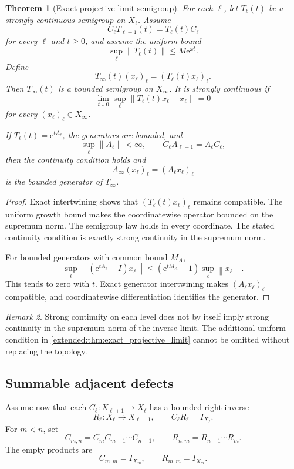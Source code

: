 \documentclass[11pt,a4paper]{article}
\newtheorem{theorem}{Theorem}[section]
\theoremstyle{definition}
\theoremstyle{remark}
\newtheorem{remark}[theorem]{Remark}
\newcommand{\norm}[1]{\left\lVert#1\right\rVert}
\newcommand{\e}{\mathrm e}
\begin{document}
\begin{theorem}[Exact projective limit semigroup]\label{extended:record:016}\label{extended:thm:exact_projective_limit}
For each \(\ell\), let \(T_\ell(t)\) be a strongly continuous semigroup on \(X_\ell\). Assume
\[
C_\ell T_{\ell+1}(t)=T_\ell(t)C_\ell
\]
for every \(\ell\) and \(t\geq0\), and assume the uniform bound
\[
\sup_\ell\norm{T_\ell(t)}\leq M\e^{\omega t}.
\]
Define
\[
T_\infty(t)(x_\ell)_\ell
=
(T_\ell(t)x_\ell)_\ell.
\]
Then \(T_\infty(t)\) is a bounded semigroup on \(X_\infty\). It is strongly continuous if
\[
\lim_{t\downarrow0}
\sup_\ell
\norm{T_\ell(t)x_\ell-x_\ell}=0
\]
for every \((x_\ell)_\ell\in X_\infty\).

If \(T_\ell(t)=\e^{tA_\ell}\), the generators are bounded, and
\[
\sup_\ell\norm{A_\ell}<\infty,
\qquad
C_\ell A_{\ell+1}=A_\ell C_\ell,
\]
then the continuity condition holds and
\[
A_\infty(x_\ell)_\ell=(A_\ell x_\ell)_\ell
\]
is the bounded generator of \(T_\infty\).
\end{theorem}

\begin{proof}
Exact intertwining shows that \((T_\ell(t)x_\ell)_\ell\) remains compatible. The uniform growth bound makes the coordinatewise operator bounded on the supremum norm. The semigroup law holds in every coordinate. The stated continuity condition is exactly strong continuity in the supremum norm.

For bounded generators with common bound \(M_A\),
\[
\sup_\ell
\norm{(\e^{tA_\ell}-I)x_\ell}
\leq
(\e^{tM_A}-1)\sup_\ell\norm{x_\ell}.
\]
This tends to zero with \(t\). Exact generator intertwining makes \((A_\ell x_\ell)_\ell\) compatible, and coordinatewise differentiation identifies the generator.
\end{proof}

\begin{remark}\label{extended:record:017}
Strong continuity on each level does not by itself imply strong continuity in the supremum norm of the inverse limit. The additional uniform condition in \cref{extended:thm:exact_projective_limit} cannot be omitted without replacing the topology.
\end{remark}

\subsection{Summable adjacent defects}

Assume now that each \(C_\ell:X_{\ell+1}\to X_\ell\) has a bounded right inverse
\[
R_\ell:X_\ell\to X_{\ell+1},
\qquad
C_\ell R_\ell=I_{X_\ell}.
\]
For \(m<n\), set
\[
C_{m,n}=C_mC_{m+1}\cdots C_{n-1},
\qquad
R_{n,m}=R_{n-1}\cdots R_m.
\]
The empty products are
\[
C_{m,m}=I_{X_m},
\qquad
R_{m,m}=I_{X_m}.
\]
\end{document}

